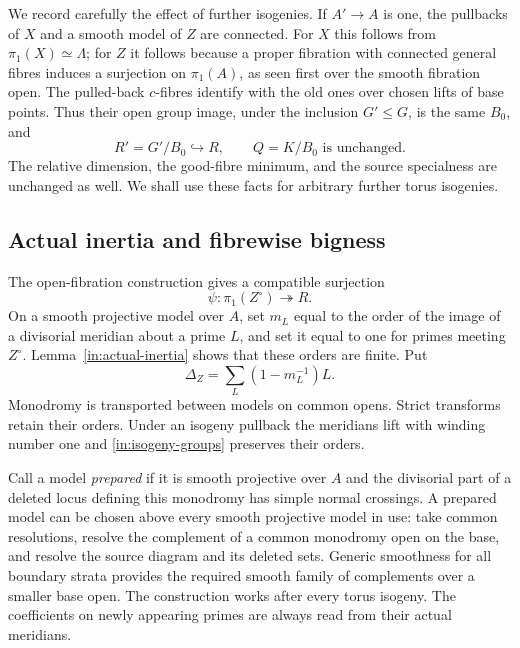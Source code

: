 We record carefully the effect of further isogenies.  If $A'\to A$
is one, the pullbacks of $X$ and a smooth model of $Z$ are connected.
For $X$ this follows from $\pi_1(X)\simeq\Lambda$; for $Z$ it
follows because a proper fibration with connected general fibres
induces a surjection on $\pi_1(A)$, as seen first over the smooth
fibration open.  The pulled-back $c$-fibres identify with the old
ones over chosen lifts of base points.  Thus their open group image,
under the inclusion $G'\le G$, is the same $B_0$, and
\begin{equation}\label{in:isogeny-groups}
 R'=G'/B_0\hookrightarrow R,
 \qquad Q=K/B_0\text{ is unchanged}.
\end{equation}
The relative dimension, the good-fibre minimum, and the source
specialness are unchanged as well.  We shall use these facts for
arbitrary further torus isogenies.

\subsection{Actual inertia and fibrewise bigness}

The open-fibration construction gives a compatible surjection
\[
 \psi:\pi_1(Z^\circ)\twoheadrightarrow R.
\]
On a smooth projective model over $A$, set $m_L$ equal to the order
of the image of a divisorial meridian about a prime $L$, and set it
equal to one for primes meeting $Z^\circ$.  Lemma~\ref{in:actual-inertia}
shows that these orders are finite.  Put
\begin{equation}\label{in:true-boundary}
 \Delta_Z=\sum_L(1-m_L^{-1})L.
\end{equation}
Monodromy is transported between models on common opens.  Strict
transforms retain their orders.  Under an isogeny pullback the
meridians lift with winding number one and
\eqref{in:isogeny-groups} preserves their orders.

Call a model \emph{prepared} if it is smooth projective over $A$ and
the divisorial part of a deleted locus defining this monodromy has
simple normal crossings. A prepared model can be chosen above every
smooth projective model in use: take common resolutions, resolve the
complement of a common monodromy open on the base, and resolve the
source diagram and its deleted sets.  Generic smoothness for all
boundary strata provides the required smooth family of complements
over a smaller base open.  The construction works after every torus
isogeny.  The coefficients on newly appearing primes are always read
from their actual meridians.

